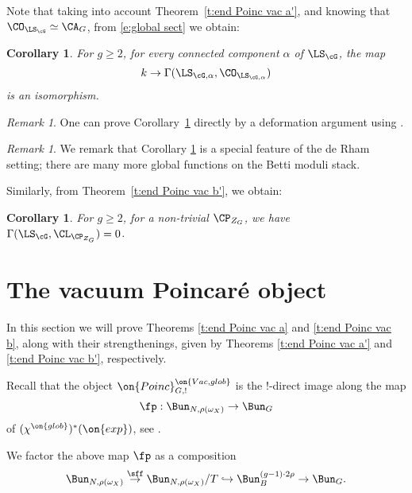 \documentclass[9pt]{amsart}
\newtheorem{cor}[subsubsection]{Corollary}
\theoremstyle{remark}
\newtheorem{rem}[subsubsection]{Remark}
\theoremstyle{definition}
\theoremstyle{remark}
\newcommand{\thmref}[1]{Theorem~\ref{#1}}
\newcommand{\corref}[1]{Corollary~\ref{#1}}
\numberwithin{equation}{section}
\begin{document}
\sssec{}

Note that taking into account \thmref{t:end Poinc vac a'}, and knowing that $\CO_{\LS_\cG}\simeq \CA_G$, from 
\eqref{e:global sect} we obtain:

\begin{cor} \label{c:O on LS}
For $g\geq 2$, for every connected component $\alpha$ of $\LS_\cG$, the map
$$k\to \Gamma(\LS_{\cG,\alpha},\CO_{\LS_{\cG,\alpha}})$$
is an isomorphism.
\end{cor} 

\begin{rem}
One can prove \corref{c:O on LS} directly by a deformation argument using 
\cite[Theorem 4.2]{FT}. 
\end{rem}

\begin{rem}
We remark that Corollary \ref{c:O on LS} is a special feature of the de Rham setting; 
there are many more global functions on the Betti moduli stack. 
\end{rem}

\sssec{}

Similarly, from \thmref{t:end Poinc vac b'}, we obtain:

\begin{cor}
For $g\geq 2$, for a non-trivial $\CP_{Z_G}$, we have $\Gamma(\LS_\cG,\CL_{\CP_{Z_G}})=0$. 
\end{cor} 

\section{The vacuum Poincar\'e object} \label{s:Poinc}

In this section we will prove Theorems \ref{t:end Poinc vac a} and \ref{t:end Poinc vac b}, along with their strengthenings,
given by Theorems \ref{t:end Poinc vac a'} and \ref{t:end Poinc vac b'}, respectively. 


\sssec{}

Recall that the object $\on{Poinc}^{\on{Vac,glob}}_{G,!}$ is the !-direct image along the map
$$\fp:\Bun_{N,\rho(\omega_X)}\to \Bun_G$$
of $(\chi^{\on{glob}})^*(\on{exp})$, see \cite[Sect. 1.3.6]{GLC1}.

\medskip

We factor the above map $\fp$ as a composition
\begin{equation} \label{e:factor p}
\Bun_{N,\rho(\omega_X)}\overset{\sff}\to \Bun_{N,\rho(\omega_X)}/T\hookrightarrow \Bun^{(g-1)\cdot 2\rho}_B\to \Bun_G.
\end{equation} 
\end{document}
